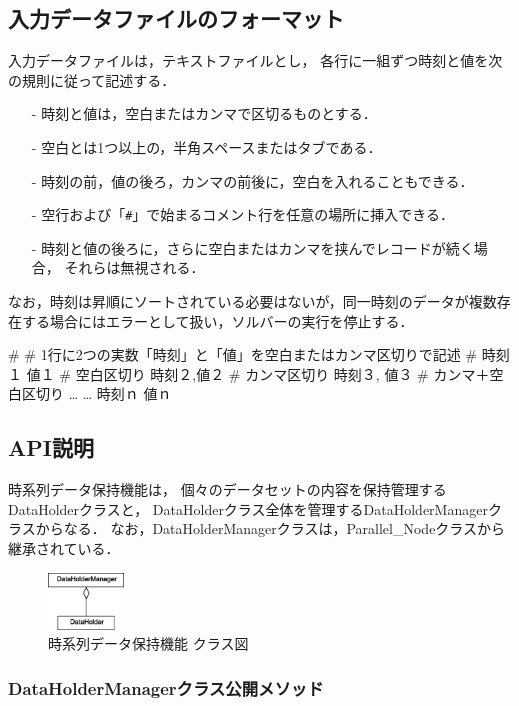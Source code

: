 \subsection{入力データファイルのフォーマット}
入力データファイルは，テキストファイルとし，
各行に一組ずつ時刻と値を次の規則に従って記述する．
\begin{itemize}
\item[-] 時刻と値は，空白またはカンマで区切るものとする．
\item[-] 空白とは1つ以上の，半角スペースまたはタブである．
\item[-] 時刻の前，値の後ろ，カンマの前後に，空白を入れることもできる．
\item[-] 空行および「{\tt \#}」で始まるコメント行を任意の場所に挿入できる．
\item[-] 時刻と値の後ろに，さらに空白またはカンマを挟んでレコードが続く場合，
それらは無視される．
\end{itemize}
なお，時刻は昇順にソートされている必要はないが，同一時刻のデータが複数存在する場合にはエラーとして扱い，ソルバーの実行を停止する．

{\small
\begin{program}
#
# 1行に2つの実数「時刻」と「値」を空白またはカンマ区切りで記述
#
  時刻１   値１  # 空白区切り
  時刻２,値２    # カンマ区切り
  時刻３,  値３  # カンマ＋空白区切り
   …       …
  時刻ｎ   値ｎ
\end{program}
}

\subsection{API説明}
時系列データ保持機能は，
個々のデータセットの内容を保持管理するDataHolderクラスと，
DataHolderクラス全体を管理するDataHolderManagerクラスからなる．
なお，DataHolderManagerクラスは，Parallel\_Nodeクラスから継承されている．
\begin{figure}[H]
\vspace{0.5cm}
\begin{center}
\includegraphics[width=0.18\textwidth]{DataHolder.eps}
\caption{時系列データ保持機能 クラス図}
\label{fig:data_holder}
\end{center}
\end{figure}

\subsubsection{DataHolderManagerクラス公開メソッド}

